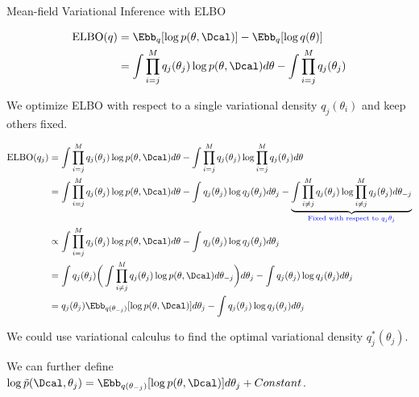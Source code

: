 \documentclass[aspectratio=169,xcolor=dvipsnames,svgnames,x11names,fleqn]{beamer}
\begin{document}
\begin{frame}[allowframebreaks]{Mean-field Variational Inference with ELBO}

\begin{tcolorbox}[title=Recall: The ELBO Definition, colframe=theoryBlue]
\footnotesize
 \begin{align*}
 \text{ELBO}(q) & = \Ebb_q[ \log p(\theta, \Dcal)] - \Ebb_q[\log q(\theta) ]\\
 & = \int \prod_{i=j}^M q_j(\theta_j) \log p(\theta, \Dcal) d\theta - \int \prod_{i=j}^M q_j(\theta_j)
 \end{align*}
\end{tcolorbox}

\vspace{0.2cm}

\small
 We optimize ELBO with respect to a single variational density $q_j(\theta_i)$ and keep others fixed.

\begin{tcolorbox}[colback=gray!5, colframe=gray!50, title=Derivation for $q_j$]
\scriptsize
 \begin{align*}
 \text{ELBO}(q_j) & = \int \prod_{i=j}^M q_j(\theta_j) \log p(\theta, \Dcal) d\theta - \int \prod_{i=j}^M q_j(\theta_j) \log \prod_{i=j}^M q_j(\theta_j) d\theta \\
 & = \int \prod_{i=j}^M q_j(\theta_j) \log p(\theta, \Dcal) d\theta  - \int  q_j(\theta_j) \log q_j(\theta_j) d\theta_j  - \underbrace{\int \prod_{i\neq j}^M q_j(\theta_j) \log \prod_{i\neq j}^M q_j(\theta_j) d\theta_{-j}}_{\color{blue}\text{Fixed with respect to }q_j{\theta_j}}\\
 & \propto \int \prod_{i=j}^M q_j(\theta_j) \log p(\theta, \Dcal) d\theta  - \int  q_j(\theta_j) \log q_j(\theta_j) d\theta_j \\
 & = \int q_j(\theta_j) \bigg( \int \prod_{i\neq j}^M q_j(\theta_j) \log p(\theta, \Dcal) d\theta_{-j}  \bigg)d\theta_j - \int  q_j(\theta_j) \log q_j(\theta_j) d\theta_j\\
 & = q_j(\theta_j) \Ebb_{q(\theta_{-j})}[ \log p(\theta, \Dcal)] d\theta_j - \int q_j(\theta_j) \log q_j(\theta_j) d\theta_j
 \end{align*}
\end{tcolorbox}

\small

We could use variational calculus to find the optimal variational density $q^*_j (\theta_j)$.
 
 We can further define $\log \tilde{p} (\Dcal, \theta_j) =  \Ebb_{q(\theta_{-j})}[ \log p(\theta, \Dcal)] d\theta_j + Constant$.
 

\end{frame}
\end{document}
